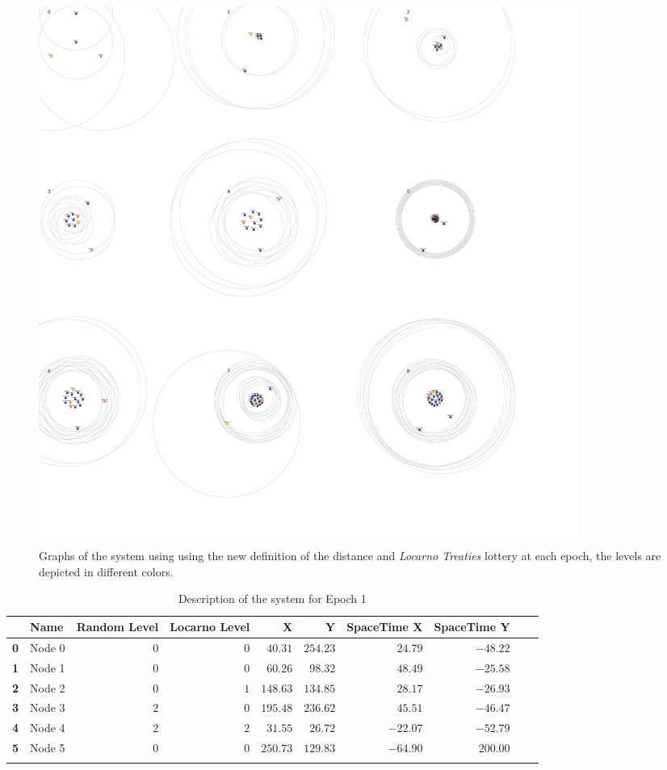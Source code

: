 \documentclass[a4paper,11pt,oneside]{report}
\begin{document}
\begin{figure}[!h] 
\centering
\includegraphics[width=500pt]{figures/SpaceTime-Locarno}
\caption{Graphs of the system using  using the new definition of the distance and \textit{Locarno Treaties} lottery at each epoch, the levels are depicted in different colors.}
  \label{fig:SpaceTime-Locarno}
\end{figure}


\begin{table}[h]
\centering
\tiny
\begin{tabular}{@{}llrrrrrrll@{}}
\toprule
& \textbf{Name}   &\textbf{Random Level} &\textbf{Locarno Level} & \textbf{X} & \textbf{Y} & \textbf{SpaceTime X} & \textbf{SpaceTime Y}  \\ \midrule
\textbf{0} & Node 0&$0$&$0$&$40.31$&$254.23$&$24.79$&$-48.22$&\\ \hdashline
\textbf{1} & Node 1&$0$&$0$&$60.26$&$98.32$&$48.49$&$-25.58$&\\ \hdashline
\textbf{2} & Node 2&$0$&$1$&$148.63$&$134.85$&$28.17$&$-26.93$&\\ \hdashline
\textbf{3} & Node 3&$2$&$0$&$195.48$&$236.62$&$45.51$&$-46.47$&\\ \hdashline
\textbf{4} & Node 4&$2$&$2$&$31.55$&$26.72$&$-22.07$&$-52.79$&\\ \hdashline
\textbf{5} & Node 5&$0$&$0$&$250.73$&$129.83$&$-64.90$&$200.00$&\\ \hdashline\midrule
\bottomrule
\end{tabular}
\caption{Description of the system for Epoch 1}
\end{table}
\end{document}
